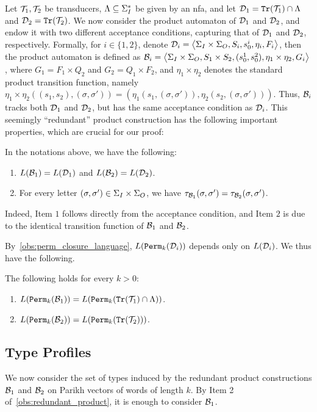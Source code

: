 Let $\mathcal{T}_1,\mathcal{T}_2$ be transducers, $\Lambda\subseteq \Sigma_{I}^*$ be given by an \gls{nfa}, and let $\mathcal{D}_1={\mathtt{Tr}}(\mathcal{T}_1)\cap \Lambda$ and $\mathcal{D}_2={\mathtt{Tr}}(\mathcal{T}_2)$. 
We now consider the product automaton of $\mathcal{D}_1$ and $\mathcal{D}_2$, and endow it with two different acceptance conditions, capturing that of $\mathcal{D}_1$ and $\mathcal{D}_2$, respectively. Formally, for $i\in \{1,2\}$, denote $\mathcal{D}_i=\left< \Sigma_{I}\times\Sigma_{O},S_i,s^i_0,\eta_i,F_i\right>$, then the product automaton is defined as $\mathcal{B}_i=\left< \Sigma_{I}\times\Sigma_{O},S_1\times S_2,(s^1_0,s^2_0),\eta_1\times \eta_2,G_i\right>$, where $G_1=F_1\times Q_2$ and $G_2=Q_1\times F_2$, and $\eta_1\times \eta_2$ denotes the standard product transition function, namely $\eta_1\times\eta_2((s_1,s_2),(\sigma,\sigma'))=(\eta_1(s_1,(\sigma,\sigma')),\eta_2(s_2,(\sigma,\sigma')))$. Thus, $\mathcal{B}_i$ tracks both $\mathcal{D}_1$ and $\mathcal{D}_2$, but has the same acceptance condition as $\mathcal{D}_i$. This seemingly ``redundant'' product construction has the following important properties, which are crucial for our proof:
\begin{observation}
	\label{obs:redundant_product}
 In the notations above, we have the following:
	\begin{enumerate}
		\item $L(\mathcal{B}_1)=L(\mathcal{D}_1)$ and $L(\mathcal{B}_2)=L(\mathcal{D}_2)$.
		\item For every letter $(\sigma,\sigma')\in \Sigma_{I}\times\Sigma_{O}$, we have $\tau_{\mathcal{B}_1}(\sigma,\sigma')=\tau_{\mathcal{B}_2}(\sigma,\sigma')$.
	\end{enumerate}
	\end{observation}
	
Indeed, Item $1$ follows directly from the acceptance condition, and Item $2$ is due to the identical transition function of $\mathcal{B}_1$ and $\mathcal{B}_2$.

By~\cref{obs:perm_closure_language}, $L({\mathtt{Perm}}_k(\mathcal{D}_i))$ depends only on $L(\mathcal{D}_i)$. We thus have the following.
\begin{observation}
	\label{obs:redundant_product_for_perm_automata}
	 The following holds for every $k>0$:
	  \begin{enumerate}
	      \item $L({\mathtt{Perm}}_k(\mathcal{B}_1))=L({\mathtt{Perm}}_k({\mathtt{Tr}}(\mathcal{T}_1)\cap \Lambda))$.
	      \item $L({\mathtt{Perm}}_k(\mathcal{B}_2))=L({\mathtt{Perm}}_k({\mathtt{Tr}}(\mathcal{T}_2)))$.
	  \end{enumerate}
	\end{observation}

\subsection*{Type Profiles}
We now consider the set of types induced by the redundant product constructions $\mathcal{B}_1$ and $\mathcal{B}_2$ on Parikh vectors of words of length $k$. By Item 2 of~\cref{obs:redundant_product}, it is enough to consider $\mathcal{B}_1$. 

